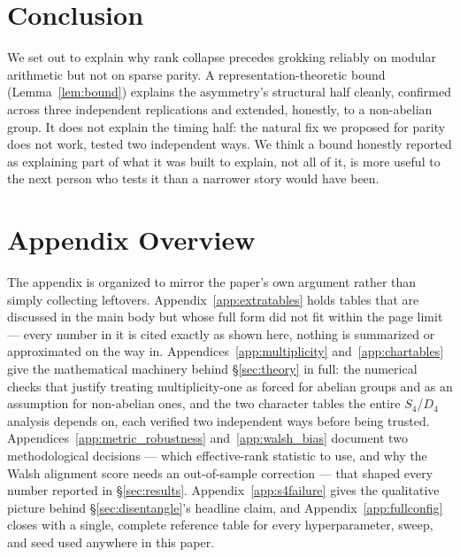 \documentclass{article}
\begin{document}
\section{Conclusion}
\label{sec:conclusion}

We set out to explain why rank collapse precedes grokking reliably on
modular arithmetic but not on sparse parity. A representation-theoretic
bound (Lemma~\ref{lem:bound}) explains the asymmetry's structural half
cleanly, confirmed across three independent replications and extended,
honestly, to a non-abelian group. It does not explain the timing half:
the natural fix we proposed for parity does not work, tested two
independent ways. We think a bound honestly reported as explaining
part of what it was built to explain, not all of it, is more useful to
the next person who tests it than a narrower story would have been.





\newpage
\appendix

\section*{Appendix Overview}

The appendix is organized to mirror the paper's own argument rather than
simply collecting leftovers. Appendix~\ref{app:extratables} holds tables
that are discussed in the main body but whose full form did not fit
within the page limit --- every number in it is cited exactly as shown
here, nothing is summarized or approximated on the way in. Appendices~\ref{app:multiplicity}
and~\ref{app:chartables} give the mathematical machinery behind
\S\ref{sec:theory} in full: the numerical checks that justify treating
multiplicity-one as forced for abelian groups and as an assumption for
non-abelian ones, and the two character tables the entire $S_4$/$D_4$
analysis depends on, each verified two independent ways before being
trusted. Appendices~\ref{app:metric_robustness} and~\ref{app:walsh_bias}
document two methodological decisions --- which effective-rank statistic
to use, and why the Walsh alignment score needs an out-of-sample
correction --- that shaped every number reported in \S\ref{sec:results}.
Appendix~\ref{app:s4failure} gives the qualitative picture behind
\S\ref{sec:disentangle}'s headline claim, and Appendix~\ref{app:fullconfig}
closes with a single, complete reference table for every hyperparameter,
sweep, and seed used anywhere in this paper.
\end{document}
